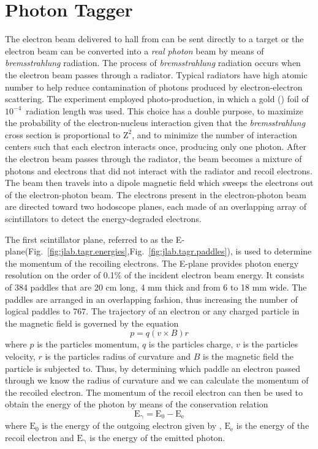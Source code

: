 \section{Photon Tagger} \label{sec:clas.tagr}

The electron beam delivered to hall  from  can be sent directly to a target or the electron beam can be converted into a \emph{real photon} beam by means of \emph{bremsstrahlung} radiation. The process of \emph{bremsstrahlung} radiation occurs when the electron beam passes through a radiator. Typical radiators have high atomic number to help reduce contamination of photons produced by electron-electron scattering. The  experiment employed photo-production, in which a gold () foil of $10^{-4}$~radiation length was used. This choice has a double purpose, to maximize the probability of the electron-nucleus interaction given that the \emph{bremsstrahlung} cross section is proportional to $\mathrm{Z^{2}}$, and to minimize the number of interaction centers such that each electron interacts once, producing only one photon. After the electron beam passes through the radiator, the beam becomes a mixture of photons and electrons that did not interact with the radiator and recoil electrons. The beam then travels into a dipole magnetic field which sweeps the electrons out of the electron-photon beam. The electrons present in the electron-photon beam are directed toward two hodoscope planes, each made of an overlapping array of scintillators to detect the energy-degraded electrons.

%  

The first scintillator plane, referred to as the E-plane(Fig.~\ref{fig:jlab.tagr.energies},Fig.~\ref{fig:jlab.tagr.paddles}), is used to determine the momentum of the recoiling electrons. The E-plane provides photon energy resolution on the order of 0.1\% of the incident electron beam energy. It consists of 384 paddles that are 20 cm long, 4 mm thick and from 6 to 18 mm wide. The paddles are arranged in an overlapping fashion, thus increasing the number of logical paddles to 767.
The trajectory of an electron or any charged particle in the magnetic field is governed by the equation
\begin{equation}\label{eq:motioninmag}
	p = q(v \times B)r
\end{equation}
where $p$ is the particles momentum, $q$ is the particles charge, $v$ is the particles velocity, $r$ is the particles radius of curvature and $B$ is the magnetic field the particle is subjected to.
Thus, by determining which paddle an electron passed through we know the radius of curvature and we can calculate the momentum of the recoiled electron. The momentum of the recoil electron can then be used to obtain the energy of the photon by means of the conservation relation 
\begin{equation}
	\mathrm{E_{\gamma} = E_{0} - E_{e}}
\end{equation}
where $\mathrm{E_{0}}$ is the energy of the outgoing electron given by , $\mathrm{E_{e}}$ is the energy of the recoil electron and $\mathrm{E_{\gamma}}$ is the energy of the emitted photon. 

